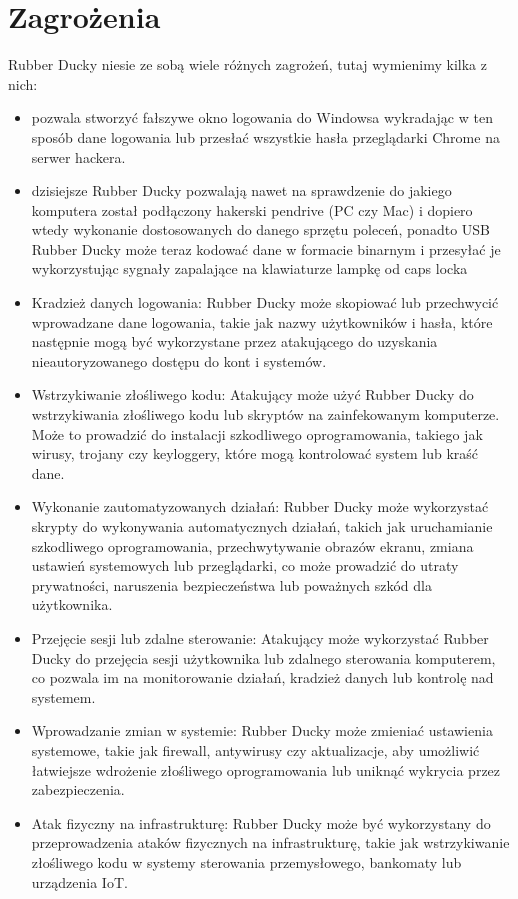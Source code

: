 \documentclass{article}
\begin{document}
\section{Zagrożenia}
Rubber Ducky niesie ze sobą wiele różnych zagrożeń, tutaj wymienimy kilka z nich:
\begin{itemize}
    \item pozwala stworzyć fałszywe okno logowania do Windowsa wykradając w ten sposób dane logowania lub przesłać wszystkie hasła przeglądarki Chrome na serwer hackera. 
    \item dzisiejsze Rubber Ducky pozwalają nawet na sprawdzenie do jakiego komputera został podłączony hakerski pendrive (PC czy Mac) i dopiero wtedy wykonanie dostosowanych do danego sprzętu poleceń, ponadto USB Rubber Ducky może teraz kodować dane w formacie binarnym i przesyłać je wykorzystując sygnały zapalające na klawiaturze lampkę od caps locka
    \item Kradzież danych logowania: Rubber Ducky może skopiować lub przechwycić wprowadzane dane logowania, takie jak nazwy użytkowników i hasła, które następnie mogą być wykorzystane przez atakującego do uzyskania nieautoryzowanego dostępu do kont i systemów.
    \item Wstrzykiwanie złośliwego kodu: Atakujący może użyć Rubber Ducky do wstrzykiwania złośliwego kodu lub skryptów na zainfekowanym komputerze. Może to prowadzić do instalacji szkodliwego oprogramowania, takiego jak wirusy, trojany czy keyloggery, które mogą kontrolować system lub kraść dane.
    \item Wykonanie zautomatyzowanych działań: Rubber Ducky może wykorzystać skrypty do wykonywania automatycznych działań, takich jak uruchamianie szkodliwego oprogramowania, przechwytywanie obrazów ekranu, zmiana ustawień systemowych lub przeglądarki, co może prowadzić do utraty prywatności, naruszenia bezpieczeństwa lub poważnych szkód dla użytkownika.
    \item  Przejęcie sesji lub zdalne sterowanie: Atakujący może wykorzystać Rubber Ducky do przejęcia sesji użytkownika lub zdalnego sterowania komputerem, co pozwala im na monitorowanie działań, kradzież danych lub kontrolę nad systemem.
    \item Wprowadzanie zmian w systemie: Rubber Ducky może zmieniać ustawienia systemowe, takie jak firewall, antywirusy czy aktualizacje, aby umożliwić łatwiejsze wdrożenie złośliwego oprogramowania lub uniknąć wykrycia przez zabezpieczenia.
    \item  Atak fizyczny na infrastrukturę: Rubber Ducky może być wykorzystany do przeprowadzenia ataków fizycznych na infrastrukturę, takie jak wstrzykiwanie złośliwego kodu w systemy sterowania przemysłowego, bankomaty lub urządzenia IoT.

    
\end{itemize} 
\end{document}
